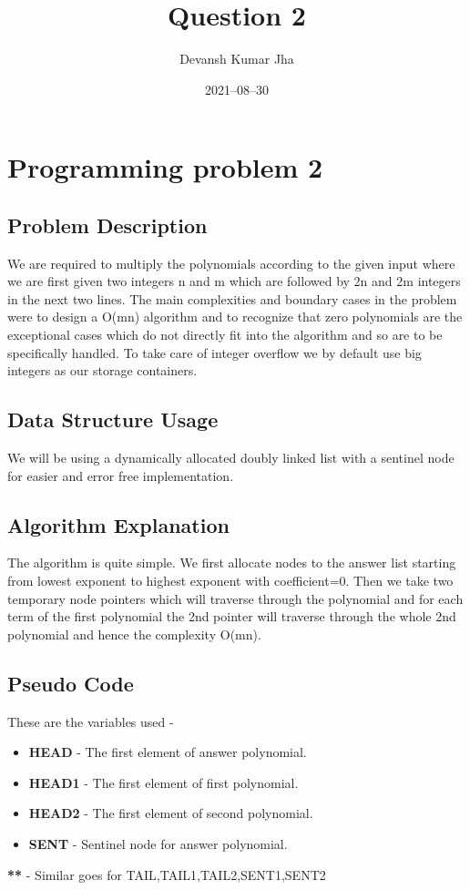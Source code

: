 \documentclass[20pt]{article}
\title{Question 2}
\author{Devansh Kumar Jha}
\date{2021–08–30}
\begin{document}
\maketitle

\section{Programming problem 2}

\subsection{Problem Description}
We are required to multiply the polynomials according to the given input where we are first given two integers n and m which are followed by {2n} and {2m} integers in the next two lines.
The main complexities and boundary cases in the problem were to design a {O(mn)} algorithm and to recognize that zero polynomials are the exceptional cases which do not directly fit into the algorithm and so are to be specifically handled. To take care of integer overflow we by default use big integers as our storage containers.

\subsection{Data Structure Usage}
We will be using a dynamically allocated doubly linked list with a sentinel node for easier and error free implementation.

\subsection{Algorithm Explanation}
The algorithm is quite simple. We first allocate nodes to the answer list starting from lowest exponent to highest exponent with coefficient=0. Then we take two temporary node pointers which will traverse through the polynomial and for each term of the first polynomial the 2nd pointer will traverse through the whole 2nd polynomial and hence the complexity {O(mn)}.

\subsection{Pseudo Code}
These are the variables used - 
\begin{itemize}
\item \textbf{HEAD}   - The first element of answer polynomial.
\item \textbf{HEAD1} - The first element of first polynomial.
\item \textbf{HEAD2} - The first element of second polynomial.
\item \textbf{SENT}   - Sentinel node for answer polynomial.
\end{itemize}
\textbf{**} - Similar goes for {TAIL,TAIL1,TAIL2,SENT1,SENT2}
\end{document}
